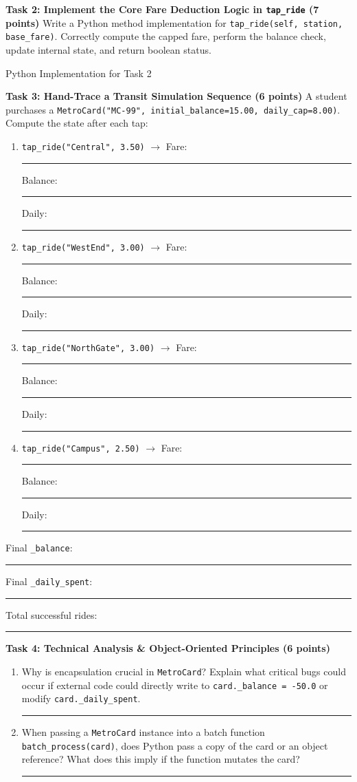 \documentclass[11pt,a4paper]{article}
\begin{document}
\textbf{Task 2: Implement the Core Fare Deduction Logic in \texttt{tap\_ride} (7 points)}
Write a Python method implementation for \texttt{tap\_ride(self, station, base\_fare)}. Correctly compute the capped fare, perform the balance check, update internal state, and return boolean status.
\begin{answerbox}[height=3.4cm]{Python Implementation for Task 2}\end{answerbox}
\textbf{Task 3: Hand-Trace a Transit Simulation Sequence (6 points)}
A student purchases a \texttt{MetroCard("MC-99", initial\_balance=15.00, daily\_cap=8.00)}. Compute the state after each tap:
\begin{enumerate}[label=\arabic*.,leftmargin=1.8em,itemsep=1pt]
\item \texttt{tap\_ride("Central", 3.50)} $\rightarrow$ Fare: \rule{1.6cm}{0.4pt} \quad Balance: \rule{1.6cm}{0.4pt} \quad Daily: \rule{1.6cm}{0.4pt}
\item \texttt{tap\_ride("WestEnd", 3.00)} $\rightarrow$ Fare: \rule{1.6cm}{0.4pt} \quad Balance: \rule{1.6cm}{0.4pt} \quad Daily: \rule{1.6cm}{0.4pt}
\item \texttt{tap\_ride("NorthGate", 3.00)} $\rightarrow$ Fare: \rule{1.6cm}{0.4pt} \quad Balance: \rule{1.6cm}{0.4pt} \quad Daily: \rule{1.6cm}{0.4pt}
\item \texttt{tap\_ride("Campus", 2.50)} $\rightarrow$ Fare: \rule{1.6cm}{0.4pt} \quad Balance: \rule{1.6cm}{0.4pt} \quad Daily: \rule{1.6cm}{0.4pt}
\end{enumerate}
Final \texttt{\_balance}: \rule{2.2cm}{0.4pt} \quad Final \texttt{\_daily\_spent}: \rule{2.2cm}{0.4pt} \quad Total successful rides: \rule{2.2cm}{0.4pt}
\vspace{0.5mm}
\textbf{Task 4: Technical Analysis \& Object-Oriented Principles (6 points)}
\begin{enumerate}[label=\alph*),leftmargin=1.8em,itemsep=1.5pt]
\item Why is encapsulation crucial in \texttt{MetroCard}? Explain what critical bugs could occur if external code could directly write to \texttt{card.\_balance = -50.0} or modify \texttt{card.\_daily\_spent}.\\[-1pt]\rule{\linewidth}{0.4pt}
\item When passing a \texttt{MetroCard} instance into a batch function \texttt{batch\_process(card)}, does Python pass a copy of the card or an object reference? What does this imply if the function mutates the card?\\[-1pt]\rule{\linewidth}{0.4pt}
\end{enumerate}
\newpage
\end{document}
